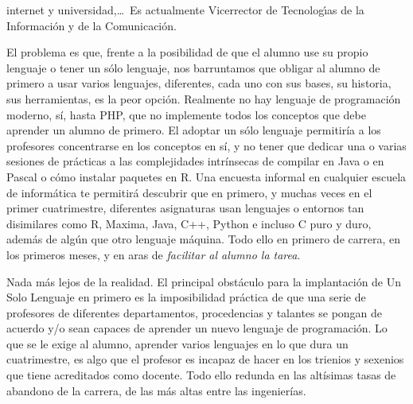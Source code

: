 \documentclass[twoside,10pt]{article}
\begin{document}
\begin{multicols}{2}
{{\begin{window}
		internet y universidad,\ldots\ 
		Es actualmente Vicerrector de Tecnolog\'{\i}as de la Informaci\'{o}n y
de la Comunicaci\'{o}n.   
		\end{window}}}

El problema es que, frente a la posibilidad de que el alumno use su
propio lenguaje o tener un sólo lenguaje, nos barruntamos que obligar
al alumno de primero a usar varios lenguajes, diferentes, cada uno con
sus bases, su historia, sus herramientas, es la peor opción. Realmente
no hay lenguaje de programación moderno, sí, hasta PHP, que no
implemente todos los conceptos que debe aprender un alumno de
primero. El adoptar un sólo lenguaje permitiría a los profesores
concentrarse en los conceptos en sí, y no tener que dedicar una o
varias sesiones de prácticas a las complejidades intrínsecas de
compilar en Java o en Pascal o cómo instalar paquetes en R. Una
encuesta informal en cualquier escuela de informática te permitirá
descubrir que en primero, y muchas veces en el primer cuatrimestre,
diferentes asignaturas usan lenguajes o entornos tan disimilares como
R, Maxima, Java, C++, Python e incluso C puro y duro, además de algún
que otro lenguaje máquina. Todo ello en primero de carrera, en los
primeros meses, y en aras de {\em facilitar al alumno la tarea}. 

Nada más lejos de la realidad. El principal obstáculo para la
implantación de Un Solo Lenguaje en primero es la imposibilidad
práctica de que una serie de profesores de diferentes departamentos,
procedencias y talantes se pongan de acuerdo y/o sean capaces de
aprender un nuevo lenguaje de programación. Lo que se le exige al
alumno, aprender varios lenguajes en lo que dura un cuatrimestre, es
algo que el profesor es incapaz de hacer en los trienios y sexenios
que tiene acreditados como docente. Todo ello redunda en las altísimas
tasas de abandono de la carrera, de las más altas entre las
ingenierías. 


\end{multicols}
\end{document}
